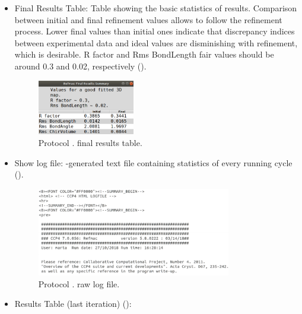 \begin{itemize}
\begin{itemize}
\begin{figure}[H]
         \label{fig:app_protocol_refmac_4}
        \end{figure}
     \item Final Results Table:
     Table showing the basic statistics of  results. Comparison between initial and final refinement values allows to follow the refinement process. Lower final values than initial ones indicate that discrepancy indices between experimental data and ideal values are disminishing with refinement, which is desirable. R factor and Rms BondLength fair values should be around 0.3 and 0.02, respectively ().
        \begin{figure}[H]
         \centering 
         \captionsetup{width=.7\linewidth} 
         \includegraphics[width=0.40\textwidth]{Images_appendix/Fig130.pdf}
         \caption{Protocol .  final results table.}
         \label{fig:app_protocol_refmac_5}
        \end{figure}
     \item Show log file:
     -generated text file containing statistics of every  running cycle ().
        \begin{figure}[H]
         \centering 
         \captionsetup{width=.7\linewidth} 
         \includegraphics[width=0.80\textwidth]{Images_appendix/Fig131.pdf}
         \caption{Protocol .  raw log file.}
         \label{fig:app_protocol_refmac_6}
        \end{figure}
     \item Results Table (last iteration) ():
        \begin{figure}[H]

\end{figure}
\end{itemize}
\end{itemize}
